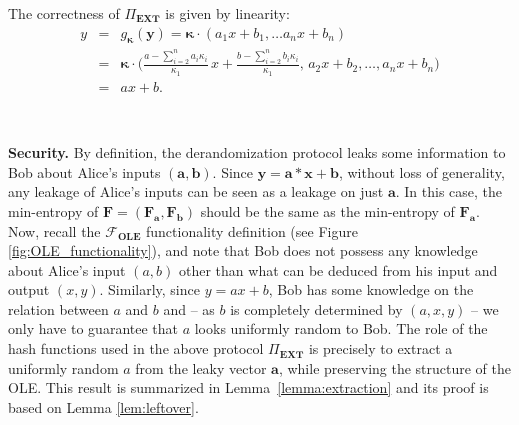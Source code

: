 The correctness of $\Pi_{\textbf{EXT}}$ is given by linearity:
\begin{eqnarray*}
y &=& g_{\bm{\kappa}}(\bm{y}) = \bm{\kappa} \cdot (a_1 x + b_1 ,\ldots a_n x + b_n) \\
&=& \bm{\kappa} \cdot \Bigg(\frac{a - \sum_{i=2}^{n} a_i \kappa_i}{
\kappa_1}\, x + \frac{b - \sum_{i=2}^{n} b_i \kappa_i}{\kappa_1},\, a_2 x + b_2, \ldots , a_n x + b_n \Bigg)\\
&=& a x + b.
\end{eqnarray*}

\

\noindent\textbf{Security.} 
By definition, the derandomization protocol leaks some information to Bob about Alice's inputs $(\bm{a}, \bm{b})$. Since $\bm{y = a  * x + b}$, without loss of generality, any leakage of Alice's inputs can be seen as a leakage on just $\bm{a}$. In this case, the min-entropy of $\mathbf{F} = (\mathbf{F}_{\bm{a}}, \mathbf{F}_{\bm{b}})$ should be the same as the min-entropy of $\mathbf{F}_{\bm{a}}$. Now, recall the $\mathcal{F}_{\textbf{OLE}}$ functionality definition (see Figure \ref{fig:OLE_functionality}),  and note that Bob does not possess any knowledge about Alice's input $(a,b)$ other than what can be deduced from his input and output $(x, y)$. Similarly, since $y = ax + b$, Bob has some knowledge on the relation between $a$ and $b$ and --  as $b$ is completely determined by $(a,x,y)$ --  we only have to guarantee that $a$ looks uniformly random to Bob. The role of the hash functions used in the above protocol $\Pi_{\textbf{EXT}}$ is precisely to extract a uniformly random $a$ from the leaky vector $\bm{a}$, while preserving the structure of the OLE. This result is summarized in Lemma~\ref{lemma:extraction} and its proof is based on  Lemma \ref{lem:leftover}. 



